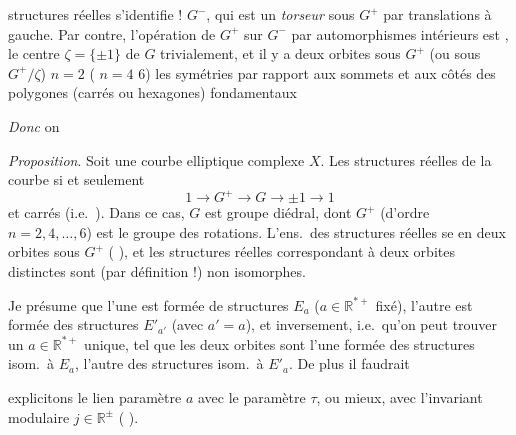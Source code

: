 \documentclass[11pt,a4paper]{article}
\begin{document}
structures réelles s'identifie ! $G^{-}$, qui est un \emph{torseur} sous
$G^{+}$ par translations à gauche. Par contre, l'opération de $G^{+}$ sur
$G^{-}$ par automorphismes intérieurs est \ill{} \ill{}, le centre
$\zeta = \{\pm 1\}$ de $G$  trivialement, et il y a deux
orbites sous $G^{+}$ (ou sous $G^{+}/\zeta$)  $n = 2$
 \ill{} ( $n = 4$  $6$) les
symétries par rapport \struck{\ill{}}  aux sommets et aux
côtés des \struck{\ill{}} polygones (carrés ou hexagones) fondamentaux

\emph{Donc} on 

\emph{Proposition}. Soit une courbe elliptique  complexe $X$.
Les structures réelles \struck{\ill{}}  \struck{\ill{}}
\ill{} de la courbe \struck{\ill{}} \ill{} si et seulement \ill{}
\struck{\ill{}}
\[
  1 \longrightarrow G^{+} \longrightarrow G \longrightarrow \pm 1
  \longrightarrow 1
\]
\ill{} et carrés (i.e.\ ). Dans ce cas, $G$ est
  groupe diédral, dont $G^{+}$ (d'ordre
$n = 2, 4, \ldots, 6$) est le groupe des rotations. L'ens.\ des structures
réelles se  en deux orbites sous $G^{+}$ (
\ill{} \ill{}), et les structures réelles correspondant à deux orbites
distinctes sont (par définition !) non isomorphes. 

Je présume que l'une est formée de structures $E_{a}$
($a \in \mathbb{R}^{*+}$ fixé), l'autre est formée des structures $E'_{a'}$
(avec $a' = a$), et inversement, i.e.\ qu'on peut trouver un
$a \in \mathbb{R}^{*+}$ unique, tel que les deux orbites sont l'une formée des
structures isom.\ à $E_{a}$, l'autre des structures isom.\ à $E'_{a}$. De plus
il faudrait \ill{}


explicitons le lien  paramètre $a$ avec le paramètre $\tau$, ou
mieux, avec l'invariant modulaire $j \in \mathbb{R}^{\pm}$
( 
).
\end{document}

